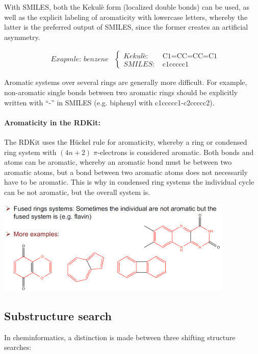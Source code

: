 With SMILES, both the Kekulè form (localized double bonds) can be used, as well as the explicit labeling of aromaticity with lowercase letters, whereby the latter is the preferred output of SMILES, since the former creates an artificial asymmetry.

\begin{align*}
    &\textit{Exapmle: benzene}&\begin{cases}
        \textit{Kekulè: }&\text{C1=CC=CC=C1}\\
        \textit{SMILES: }&\text{c1ccccc1}
    \end{cases}
\end{align*}

Aromatic systems over several rings are generally more difficult. For example, non-aromatic single bonds between two aromatic rings should be explicitly written with “-” in SMILES (e.g. biphenyl with c1ccccc1-c2ccccc2).

\paragraph{Aromaticity in the RDKit:}
The RDKit uses the Hückel rule for aromaticity, whereby a ring or condensed ring system with $(4n+2)\;\pi$-electrons is considered aromatic. Both bonds and atoms can be aromatic, whereby an aromatic bond must be between two aromatic atoms, but a bond between two aromatic atoms does not necessarily have to be aromatic. This is why in condensed ring systems the individual cycle can be not aromatic, but the overall system is.

\begin{center}\includegraphics[width=0.85\textwidth]{img/cheminformatics/AromaticRdkit.png}\end{center}

\subsection{Substructure search}

In cheminformatics, a distinction is made between three shifting structure searches:

